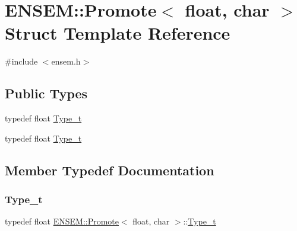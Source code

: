 \hypertarget{structENSEM_1_1Promote_3_01float_00_01char_01_4}{}\section{E\+N\+S\+EM\+:\+:Promote$<$ float, char $>$ Struct Template Reference}
\label{structENSEM_1_1Promote_3_01float_00_01char_01_4}


{\ttfamily \#include $<$ensem.\+h$>$}

\subsection*{Public Types}
\begin{DoxyCompactItemize}
\item 
typedef float \mbox{\hyperlink{structENSEM_1_1Promote_3_01float_00_01char_01_4_a6bd3d2b4d1e7c3dca5835b3bcaa5be9f}{Type\+\_\+t}}
\item 
typedef float \mbox{\hyperlink{structENSEM_1_1Promote_3_01float_00_01char_01_4_a6bd3d2b4d1e7c3dca5835b3bcaa5be9f}{Type\+\_\+t}}
\end{DoxyCompactItemize}


\subsection{Member Typedef Documentation}
\mbox{\label{structENSEM_1_1Promote_3_01float_00_01char_01_4_a6bd3d2b4d1e7c3dca5835b3bcaa5be9f}} 
\subsubsection{\texorpdfstring{Type\_t}{Type\_t}\hspace{0.1cm}{\footnotesize\ttfamily [1/2]}}
{\footnotesize\ttfamily typedef float \mbox{\hyperlink{structENSEM_1_1Promote}{E\+N\+S\+E\+M\+::\+Promote}}$<$ float, char $>$\+::\mbox{\hyperlink{structENSEM_1_1Promote_3_01float_00_01char_01_4_a6bd3d2b4d1e7c3dca5835b3bcaa5be9f}{Type\+\_\+t}}}

\mbox{\label{structENSEM_1_1Promote_3_01float_00_01char_01_4_a6bd3d2b4d1e7c3dca5835b3bcaa5be9f}} 

